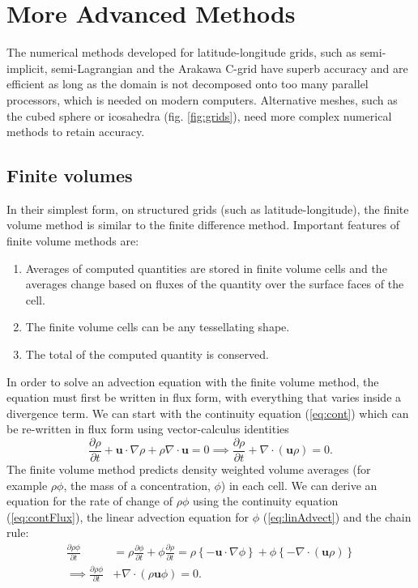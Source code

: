\section{More Advanced Methods}

The numerical methods developed for latitude-longitude grids, such
as semi-implicit, semi-Lagrangian and the Arakawa C-grid have superb
accuracy and are efficient as long as the domain is not decomposed
onto too many parallel processors, which is needed on modern computers.
Alternative meshes, such as the cubed sphere or icosahedra (fig. \ref{fig:grids}),
need more complex numerical methods to retain accuracy. 

\subsection{Finite volumes}\label{subsec:FV}

In their simplest form, on structured grids (such as latitude-longitude),
the finite volume method is similar to the finite difference method.
Important features of finite volume methods are:
\begin{enumerate}
\item Averages of computed quantities are stored in finite volume cells
and the averages change based on fluxes of the quantity over the surface
faces of the cell.
\item The finite volume cells can be any tessellating shape.
\item The total of the computed quantity is conserved.
\end{enumerate}
In order to solve an advection equation with the finite volume method,
the equation must first be written in flux form, with everything that
varies inside a divergence term. We can start with the continuity
equation (\ref{eq:cont}) which can be re-written in flux form using
vector-calculus identities
\begin{equation}
\frac{\partial\rho}{\partial t}+\mathbf{u}\cdot\nabla\rho+\rho\nabla\cdot\mathbf{u}=0\implies\frac{\partial\rho}{\partial t}+\nabla\cdot\left(\mathbf{u}\rho\right)=0.\label{eq:contFlux}
\end{equation}
The finite volume method predicts density weighted volume averages
(for example $\rho\phi$, the mass of a concentration, $\phi$) in
each cell. We can derive an equation for the rate of change of $\rho\phi$
using the continuity equation (\ref{eq:contFlux}), the linear advection
equation for $\phi$ (\ref{eq:linAdvect}) and the chain rule:
\begin{align}
\frac{\partial\rho\phi}{\partial t} & =\rho\frac{\partial\phi}{\partial t}+\phi\frac{\partial\rho}{\partial t}=\rho\left\{ -\mathbf{u}\cdot\nabla\phi\right\} +\phi\left\{ -\nabla\cdot\left(\mathbf{u}\rho\right)\right\} \nonumber \\
\implies\frac{\partial\rho\phi}{\partial t} & +\nabla\cdot\left(\rho\mathbf{u}\phi\right)=0.\label{eq:linAdvectFlux}
\end{align}

